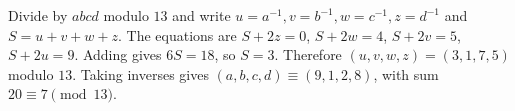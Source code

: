Divide by $abcd$ modulo $13$ and write $u=a^{-1},v=b^{-1},w=c^{-1},z=d^{-1}$ and $S=u+v+w+z$. The equations are $S+2z=0$, $S+2w=4$, $S+2v=5$, $S+2u=9$. Adding gives $6S=18$, so $S=3$. Therefore $(u,v,w,z)=(3,1,7,5)$ modulo $13$. Taking inverses gives $(a,b,c,d)\equiv(9,1,2,8)$, with sum $20\equiv\boxed7\pmod{13}$.
